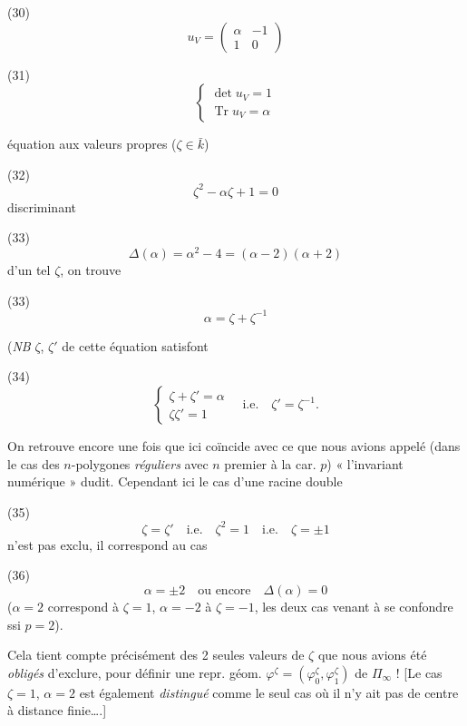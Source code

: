 \documentclass[11pt,a4paper]{article}
\begin{document}
(30)
\[
u_V = \begin{pmatrix} \alpha & -1 \\ 1 & 0 \end{pmatrix}
\]

(31)
\[
\begin{cases}
\det u_V = 1 \\
\operatorname{Tr} u_V = \alpha
\end{cases}
\]

équation aux valeurs propres ($\zeta \in \bar{k}$)

(32)
\[
\zeta^2 - \alpha\zeta + 1 = 0
\]
discriminant

(33)
\[
\Delta(\alpha) = \alpha^2 - 4 = (\alpha - 2)(\alpha + 2)
\]
\ill{} d'un tel $\zeta$, on \ill{} trouve

(33)
\[
\alpha = \zeta + \zeta^{-1}
\]

(\emph{NB} \ill{} $\zeta$, $\zeta'$ de cette équation satisfont

(34)
\[
\begin{cases}
\zeta + \zeta' = \alpha \\
\zeta\zeta' = 1
\end{cases}
\quad \text{i.e.} \quad \zeta' = \zeta^{-1} .
\]

On retrouve encore une fois que \struck{\ill{}} \ill{} ici coïncide avec ce que nous avions appelé (dans le cas des $n$-polygones \emph{réguliers} avec $n$ premier à la car. $p$) « l'invariant numérique » dudit. Cependant ici le cas d'une racine double

(35)
\[
\zeta = \zeta' \quad \text{i.e.} \quad \zeta^2 = 1 \quad \text{i.e.} \quad \zeta = \pm 1
\]
n'est pas exclu, il correspond au cas

(36)
\[
\alpha = \pm 2 \quad \text{ou encore} \quad \Delta(\alpha) = 0
\]
($\alpha = 2$ correspond à $\zeta = 1$, $\alpha = -2$ à $\zeta = -1$, les deux cas venant à se confondre ssi $p = 2$).

Cela tient compte précisément des 2 seules valeurs de $\zeta$ que nous avions été \emph{obligés} d'exclure, pour définir une repr. géom. \ill{} $\varphi^{\zeta} = (\varphi^{\zeta}_0, \varphi^{\zeta}_1)$ de $\Pi_\infty$ ! [Le cas $\zeta = 1$, $\alpha = 2$ est également \emph{distingué} comme le seul cas où il n'y ait pas de centre à distance finie….]

\end{document}
